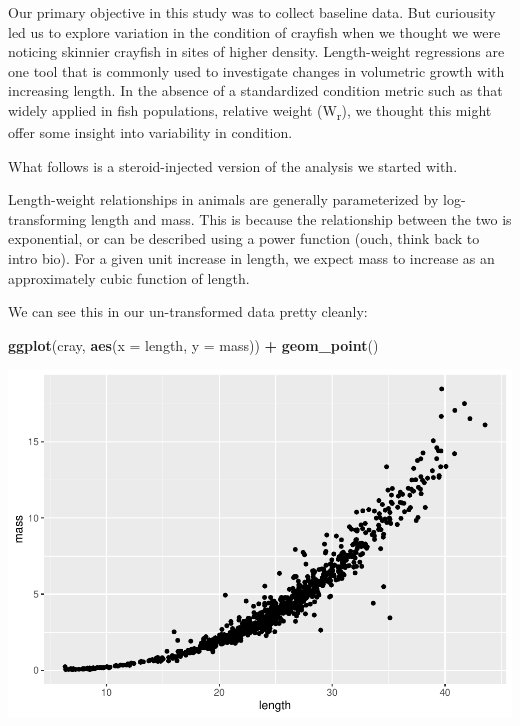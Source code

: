 \documentclass[
]{book}
\newenvironment{Shaded}{\begin{snugshade}}{\end{snugshade}}
\newcommand{\DataTypeTok}[1]{\textcolor[rgb]{0.13,0.29,0.53}{#1}}
\newcommand{\KeywordTok}[1]{\textcolor[rgb]{0.13,0.29,0.53}{\textbf{#1}}}
\newcommand{\NormalTok}[1]{#1}
\newcommand{\OperatorTok}[1]{\textcolor[rgb]{0.81,0.36,0.00}{\textbf{#1}}}
\newcommand{\StringTok}[1]{\textcolor[rgb]{0.31,0.60,0.02}{#1}}
\begin{document}
Our primary objective in this study was to collect baseline data. But curiousity led us to explore variation in the condition of crayfish when we thought we were noticing skinnier crayfish in sites of higher density. Length-weight regressions are one tool that is commonly used to investigate changes in volumetric growth with increasing length. In the absence of a standardized condition metric such as that widely applied in fish populations, relative weight (W\textsubscript{r}), we thought this might offer some insight into variability in condition.

What follows is a steroid-injected version of the analysis we started with.

Length-weight relationships in animals are generally parameterized by log-transforming length and mass. This is because the relationship between the two is exponential, or can be described using a power function (ouch, think back to intro bio). For a given unit increase in length, we expect mass to increase as an approximately cubic function of length.

We can see this in our un-transformed data pretty cleanly:

\begin{Shaded}
\begin{Highlighting}[]
\KeywordTok{ggplot}\NormalTok{(cray, }\KeywordTok{aes}\NormalTok{(}\DataTypeTok{x =}\NormalTok{ length, }\DataTypeTok{y =}\NormalTok{ mass)) }\OperatorTok{+}
\StringTok{  }\KeywordTok{geom_point}\NormalTok{()}
\end{Highlighting}
\end{Shaded}

\includegraphics{worstr_files/figure-latex/unnamed-chunk-371-1.pdf}
\end{document}
